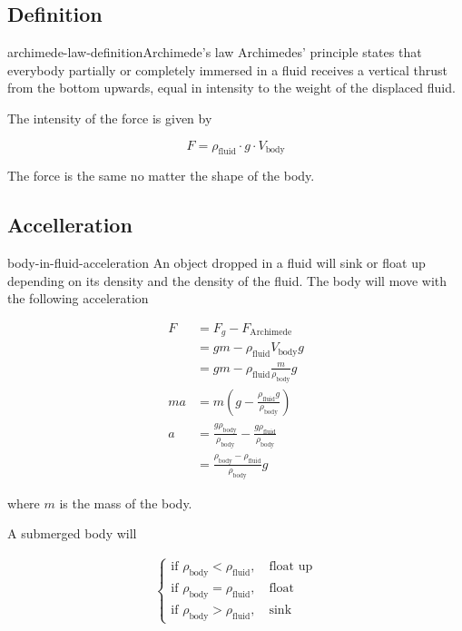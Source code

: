 \documentclass[preview]{standalone}
\begin{document}
\subsection{Definition}

\begin{snippetdefinition}{archimede-law-definition}{Archimede's law}
    Archimedes' principle states that
    everybody partially or completely immersed in a fluid receives a
    vertical thrust from the bottom upwards,
    equal in intensity to the weight of the displaced fluid.

    The intensity of the force is given by

    \[
        F = \rho_\text{fluid} \cdot g \cdot V_\text{body}
    \]

    The force is the same no matter the shape of the body.
\end{snippetdefinition}

\subsection{Accelleration}

\begin{snippet}{body-in-fluid-acceleration}
    An object dropped in a fluid will sink or float up
    depending on its density and the density of the fluid.
    The body will move with the following acceleration

    \begin{align*}
        F &= F_g - F_\text{Archimede} \\
        &= gm - \rho_\text{fluid}V_\text{body}g \\
        &= gm - \rho_\text{fluid}\frac{m}{\rho_\text{body}}g \\
        ma &= m \left( g- \frac{\rho_\text{fluid}g}{\rho_\text{body}} \right) \\
        a &= \frac{g\rho_\text{body}}{\rho_\text{body}} - \frac{g\rho_\text{fluid}}{\rho_\text{body}} \\
        &= \frac{\rho_\text{body} - \rho_\text{fluid}}{\rho_\text{body}}g
    \end{align*}

    where \(m\) is the mass of the body.

    A submerged body will

    \begin{align*}
        \begin{cases}
            \text{if } \rho_\text{body} < \rho_\text{fluid},\quad \text{float up} \\
            \text{if } \rho_\text{body} = \rho_\text{fluid},\quad \text{float} \\
            \text{if } \rho_\text{body} > \rho_\text{fluid},\quad \text{sink}
        \end{cases}
    \end{align*}
    \phantom{}
\end{snippet}
\end{document}
